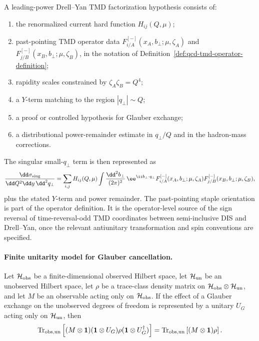 \begin{hypothesis}
\label{hyp:qcd-drell-yan-tmd-factorization-hypothesis}
A leading-power Drell--Yan TMD factorization hypothesis consists of:
\begin{enumerate}
  \item the renormalized current hard function \(H_{ij}(Q,\mu)\);
  \item past-pointing TMD operator data
  \(F_{i/A}^{[-]}(x_A,b_\perp;\mu,\zeta_A)\) and
  \(F_{j/B}^{[-]}(x_B,b_\perp;\mu,\zeta_B)\), in the notation of
  Definition~\ref{def:qcd-tmd-operator-definition};
  \item rapidity scales constrained by \(\zeta_A\zeta_B=Q^4\);
  \item a \(Y\)-term matching to the region \(|q_\perp|\sim Q\);
  \item a proof or controlled hypothesis for Glauber exchange;
  \item a distributional power-remainder estimate in \(q_\perp/Q\) and in the
  hadron-mass corrections.
\end{enumerate}
The singular small-\(q_\perp\) term is then represented as
\begin{equation}
  \frac{\dd\sigma_{\rm sing}}{\dd Q^2\dd y\,\dd^2q_\perp}
  =
  \sum_{i,j}
  H_{ij}(Q,\mu)
  \int\frac{\dd^2b_\perp}{(2\pi)^2}\,
  \ee^{\ii b_\perp\cdot q_\perp}
  F_{i/A}^{[-]}(x_A,b_\perp;\mu,\zeta_A)
  F_{j/B}^{[-]}(x_B,b_\perp;\mu,\zeta_B),
  \label{eq:qcd-drell-yan-tmd-factorization}
\end{equation}
plus the stated \(Y\)-term and power remainder.  The past-pointing staple
orientation is part of the operator definition.  It is the operator-level
source of the sign reversal of time-reversal-odd TMD coordinates between
semi-inclusive DIS and Drell--Yan, once the relevant antiunitary
transformation and spin conventions are specified.
\end{hypothesis}

\paragraph{Finite unitarity model for Glauber cancellation.}
Let \(\mathcal H_{\rm obs}\) be a finite-dimensional observed Hilbert space,
let \(\mathcal H_{\rm un}\) be an unobserved Hilbert space, let
\(\rho\) be a trace-class density matrix on
\(\mathcal H_{\rm obs}\otimes\mathcal H_{\rm un}\), and let \(M\) be an
observable acting only on \(\mathcal H_{\rm obs}\).  If the effect of a
Glauber exchange on the unobserved degrees of freedom is represented by a
unitary \(U_G\) acting only on \(\mathcal H_{\rm un}\), then
\begin{equation}
  \operatorname{Tr}_{\rm obs,un}
  \left[
    (M\otimes\mathbf1)
    (\mathbf1\otimes U_G)\rho(\mathbf1\otimes U_G^\dagger)
  \right]
  =
  \operatorname{Tr}_{\rm obs,un}
  \left[
    (M\otimes\mathbf1)\rho
  \right].
  \label{eq:qcd-finite-glauber-unitarity-identity}
\end{equation}

